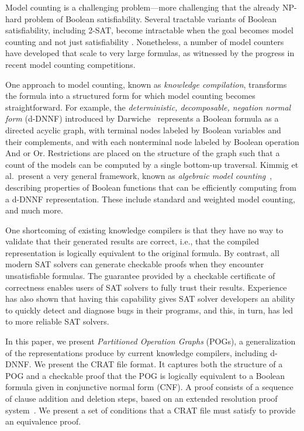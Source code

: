\documentclass[letterpaper,USenglish,cleveref, autoref, thm-restate]{lipics-v2021}
\begin{document}
Model counting is a challenging problem---more challenging that the
already NP-hard problem of Boolean satisfiability.  Several
tractable variants of Boolean satisfiability, including 2-SAT, become
intractable when the goal becomes model counting and not just
satisfiability \cite{valiant:siam:1979}.  Nonetheless, a number of
model counters have developed that scale to very large formulas, as
witnessed by the progress in recent model counting competitions.

One approach to model counting, known as {\em knowledge compilation},
transforms the formula into a structured form for which model counting
becomes straightforward.  For example, the {\em deterministic,
  decomposable, negation normal form} (d-DNNF) introduced by
Darwiche~\cite{darwiche:aaai:2002,darwiche:ecai:2004} represents a
Boolean formula as a directed acyclic graph, with terminal nodes
labeled by Boolean variables and their complements, and with each
nonterminal node labeled by Boolean operation And or Or.  Restrictions
are placed on the structure of the graph such that a count of the
models can be computed by a single bottom-up traversal.
Kimmig et al.\ present a very general framework, known as {\em
  algebraic model counting}~\cite{kimmig:jal:2017}, describing
properties of Boolean functions that can be efficiently computing from
a d-DNNF representation.  These include standard and weighted model
counting, and much more.

One shortcoming of existing knowledge compilers is that they have no
way to validate that their generated results are correct, i.e., that
the compiled representation is logically equivalent to the original
formula.  By contrast, all modern SAT solvers can generate
checkable proofs when they encounter unsatisfiable formulas.  The
guarantee provided by a checkable certificate of correctness enables
users of SAT solvers to fully trust their results.  Experience has also
shown that having this capability gives SAT solver developers an ability to quickly
detect and diagnose bugs in their programs, and this, in turn, has led
to more reliable SAT solvers.

In this paper, we present \emph{Partitioned Operation Graphs} (POGs),
a generalization of the representations produce by current knowledge
compilers, including d-DNNF\@.  We present the CRAT file format.
It captures both the structure of a POG and a checkable proof
that the POG is logically equivalent to a Boolean formula given in
conjunctive normal form (CNF).  A proof consists of a sequence of
clause addition and deletion steps, based on an extended resolution
proof system~\cite{Tseitin:1983}.  We present a set of conditions that
a CRAT file must satisfy to provide an equivalence proof.
\end{document}
